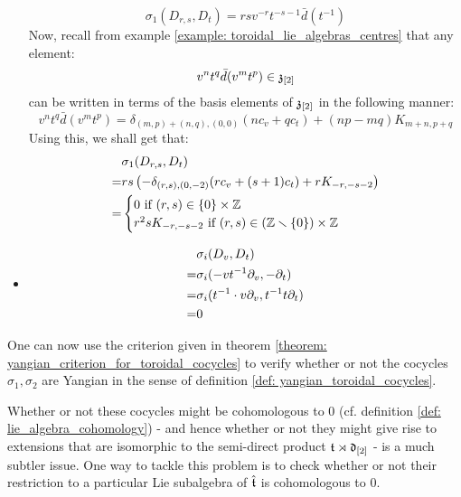 \begin{example}
\begin{itemize}
                    $$\sigma_1(D_{r, s}, D_t) = rs v^{-r} t^{-s - 1} \bar{d}(t^{-1})$$
                Now, recall from example \ref{example: toroidal_lie_algebras_centres} that any element:
                    $$v^n t^q \bar{d}(v^m t^p) \in \mathfrak{z}_{[2]}$$
                can be written in terms of the basis elements of $\mathfrak{z}_{[2]}$ in the following manner:
                    $$v^n t^q \bar{d}(v^m t^p) = \delta_{(m, p) + (n, q), (0, 0)} ( n c_v + q c_t ) + (np - mq) K_{m + n, p + q}$$
                Using this, we shall get that:
                    $$
                        \begin{aligned}
                            & \sigma_1(D_{r, s}, D_t)
                            \\
                            = & rs \left( -\delta_{(r, s), (0, -2)} ( r c_v + (s + 1) c_t ) + r K_{-r, -s - 2} \right)
                            \\
                            = & 
                            \begin{cases}
                                \text{$0$ if $(r, s) \in \{0\} \x \Z$}
                                \\
                                \text{$r^2s K_{-r, -s - 2}$ if $(r, s) \in (\Z \setminus \{0\}) \x \Z$}
                            \end{cases}
                        \end{aligned}
                    $$
                \item
                    $$
                        \begin{aligned}
                            & \sigma_i(D_v, D_t)
                            \\
                            = & \sigma_i(-v t^{-1} \partial_v, -\partial_t)
                            \\
                            = & \sigma_i(t^{-1} \cdot v \partial_v, t^{-1} t \partial_t)
                            \\
                            = & 0
                        \end{aligned}
                    $$
            \end{itemize}

            One can now use the criterion given in theorem \ref{theorem: yangian_criterion_for_toroidal_cocycles} to verify whether or not the cocycles $\sigma_1, \sigma_2$ are Yangian in the sense of definition \ref{def: yangian_toroidal_cocycles}.
        \end{example}
        Whether or not these cocycles might be cohomologous to $0$ (cf. definition \ref{def: lie_algebra_cohomology}) - and hence whether or not they might give rise to extensions that are isomorphic to the semi-direct product $\mathfrak{t} \rtimes \mathfrak{d}_{[2]}$ - is a much subtler issue. One way to tackle this problem is to check whether or not their restriction to a particular Lie subalgebra of $\hat{\mathfrak{t}}$ is cohomologous to $0$. 

